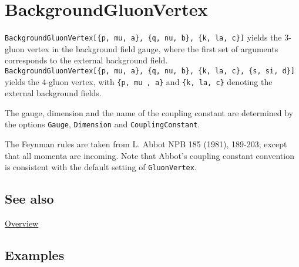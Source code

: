 \documentclass[../FeynCalcManual.tex]{subfiles}
\begin{document}
\hypertarget{backgroundgluonvertex}{
\section{BackgroundGluonVertex}\label{backgroundgluonvertex}}

\texttt{BackgroundGluonVertex[\allowbreak{}\{\allowbreak{}p,\ \allowbreak{}mu,\ \allowbreak{}a\},\ \allowbreak{}\{\allowbreak{}q,\ \allowbreak{}nu,\ \allowbreak{}b\},\ \allowbreak{}\{\allowbreak{}k,\ \allowbreak{}la,\ \allowbreak{}c\}]}
yields the 3-gluon vertex in the background field gauge, where the first
set of arguments corresponds to the external background field.
\texttt{BackgroundGluonVertex[\allowbreak{}\{\allowbreak{}p,\ \allowbreak{}mu,\ \allowbreak{}a\},\ \allowbreak{}\{\allowbreak{}q,\ \allowbreak{}nu,\ \allowbreak{}b\},\ \allowbreak{}\{\allowbreak{}k,\ \allowbreak{}la,\ \allowbreak{}c\},\ \allowbreak{}\{\allowbreak{}s,\ \allowbreak{}si,\ \allowbreak{}d\}]}
yields the 4-gluon vertex, with
\texttt{\{\allowbreak{}p,\ \allowbreak{}mu ,\ \allowbreak{}a\}} and
\texttt{\{\allowbreak{}k,\ \allowbreak{}la,\ \allowbreak{}c\}} denoting
the external background fields.

The gauge, dimension and the name of the coupling constant are
determined by the options \texttt{Gauge}, \texttt{Dimension} and
\texttt{CouplingConstant}.

The Feynman rules are taken from L. Abbot NPB 185 (1981), 189-203;
except that all momenta are incoming. Note that Abbot's coupling
constant convention is consistent with the default setting of
\texttt{GluonVertex}.

\subsection{See also}

\hyperlink{toc}{Overview}

\subsection{Examples}

\begin{Shaded}
\begin{Highlighting}[]
\OperatorTok{[\{}\OperatorTok{,} \SpecialCharTok{\textbackslash{}}\OperatorTok{[}\OperatorTok{],} \OperatorTok{\},} \OperatorTok{\{}\OperatorTok{,} \SpecialCharTok{\textbackslash{}}\OperatorTok{[}\OperatorTok{],} \OperatorTok{\},} \OperatorTok{\{}\OperatorTok{,} \SpecialCharTok{\textbackslash{}}\OperatorTok{[}\OperatorTok{],} \OperatorTok{\}]}
\end{Highlighting}
\end{Shaded}
\end{document}
